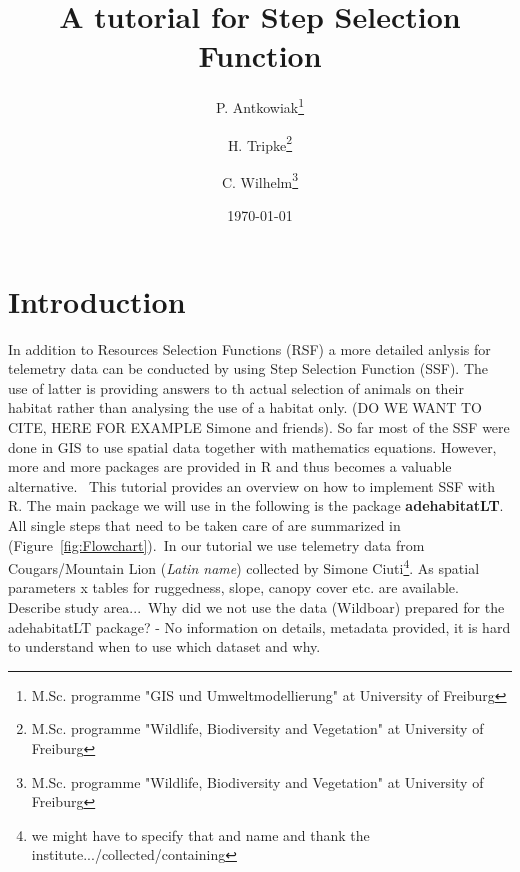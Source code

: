\documentclass[11pt, a4paper]{article}\usepackage[]{graphicx}\usepackage[]{color}
\begin{document}



\title{A tutorial for Step Selection Function}

\author{P. Antkowiak\thanks{M.Sc. programme "GIS und Umweltmodellierung" at University of Freiburg} \and H. Tripke\thanks{M.Sc. programme "Wildlife, Biodiversity and Vegetation" at University of Freiburg} \and C. Wilhelm\thanks{M.Sc. programme "Wildlife, Biodiversity and Vegetation" at University of Freiburg}}

\date{\today} %

\maketitle


\tableofcontents

\newpage

\section{Introduction}%
In addition to Resources Selection Functions (RSF) a more detailed anlysis for telemetry data can be conducted by using Step Selection Function (SSF). The use of latter is providing answers to th actual selection of animals on their habitat rather than analysing the use of a habitat only. (DO WE WANT TO CITE, HERE FOR EXAMPLE Simone and friends). So far most of the SSF were done in GIS to use spatial data together with mathematics equations. However, more and more packages are provided in R and thus becomes a valuable alternative. \
This tutorial provides an overview on how to implement SSF with R. The main package we will use in the following is the package \textbf{adehabitatLT}. All single steps that need to be taken care of are summarized in (Figure~\ref{fig:Flowchart}).\
In our tutorial we use telemetry data from Cougars/Mountain Lion (\textit{Latin name}) collected by Simone Ciuti\footnote{we might have to specify that and name and thank the institute.../collected/containing}. As spatial parameters x tables for ruggedness, slope, canopy cover etc. are available. Describe study area...\
Why did we not use the data (Wildboar) prepared for the adehabitatLT package? - No information on details, metadata provided, it is hard to understand when to use which dataset and why.
\end{document}
